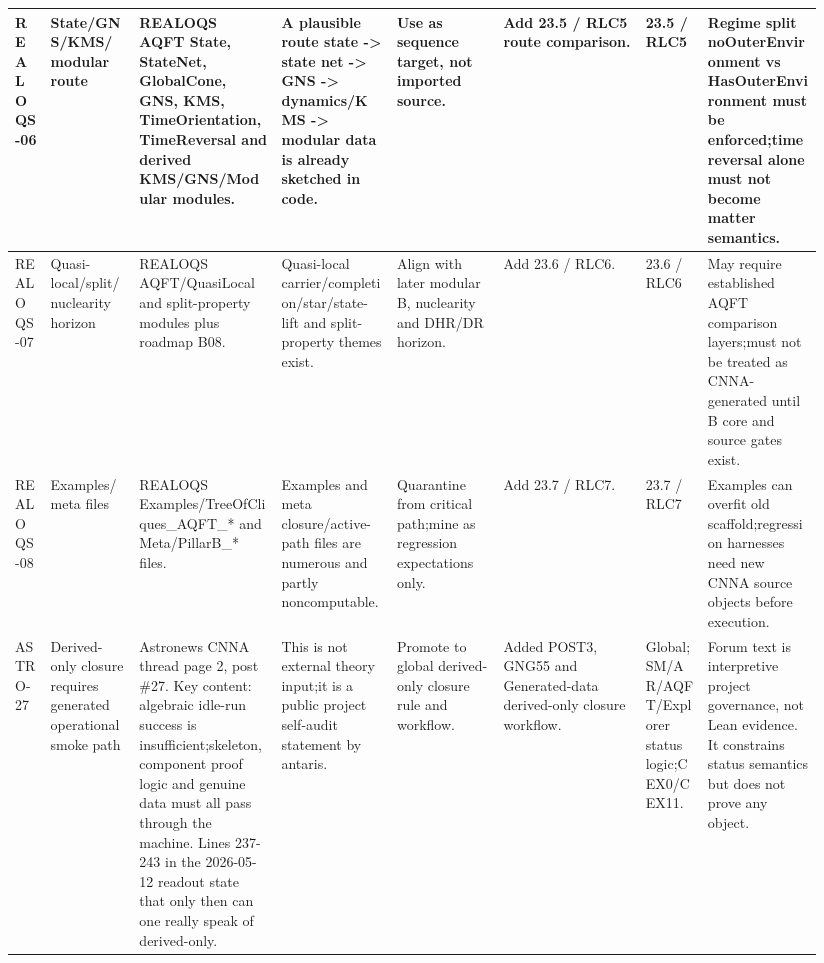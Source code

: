 \begin{longtable}{L{0.04\linewidth} L{0.105\linewidth} L{0.16\linewidth} L{0.13\linewidth} L{0.125\linewidth} L{0.165\linewidth} L{0.075\linewidth} L{0.135\linewidth}}
\hline
\addlinespace[0.24em]
REALOQS-06 & State/\allowbreak{}GNS/\allowbreak{}KMS/\allowbreak{}modular route & REALOQS AQFT State, StateNet, GlobalCone, GNS, KMS, TimeOrientation, TimeReversal and derived KMS/\allowbreak{}GNS/\allowbreak{}Modular modules. & A plausible route state -> state net -> GNS -> dynamics/\allowbreak{}KMS -> modular data is already sketched in code. & Use as sequence target, not imported source. & Add 23.5 /\allowbreak{} RLC5 route comparison. & 23.5 /\allowbreak{} RLC5 & Regime split noOuterEnvironment vs HasOuterEnvironment must be enforced;\newline time reversal alone must not become matter semantics.\\
\hline
\addlinespace[0.24em]
REALOQS-07 & Quasi-local/\allowbreak{}split/\allowbreak{}nuclearity horizon & REALOQS AQFT/\allowbreak{}QuasiLocal and split-property modules plus roadmap B08. & Quasi-local carrier/\allowbreak{}completion/\allowbreak{}star/\allowbreak{}state-lift and split-property themes exist. & Align with later modular B, nuclearity and DHR/\allowbreak{}DR horizon. & Add 23.6 /\allowbreak{} RLC6. & 23.6 /\allowbreak{} RLC6 & May require established AQFT comparison layers;\newline must not be treated as CNNA-generated until B core and source gates exist.\\
\hline
\addlinespace[0.24em]
REALOQS-08 & Examples/\allowbreak{}meta files & REALOQS Examples/\allowbreak{}TreeOfCliques\_AQFT\_* and Meta/\allowbreak{}PillarB\_* files. & Examples and meta closure/\allowbreak{}active-path files are numerous and partly noncomputable. & Quarantine from critical path;\newline mine as regression expectations only. & Add 23.7 /\allowbreak{} RLC7. & 23.7 /\allowbreak{} RLC7 & Examples can overfit old scaffold;\newline regression harnesses need new CNNA source objects before execution.\\
\hline
\addlinespace[0.24em]
ASTRO-27 & Derived-only closure requires generated operational smoke path & Astronews CNNA thread page 2, post \#27. Key content: algebraic idle-run success is insufficient;\newline skeleton, component proof logic and genuine data must all pass through the machine. Lines 237-243 in the 2026-05-12 readout state that only then can one really speak of derived-only. & This is not external theory input;\newline it is a public project self-audit statement by antaris. & Promote to global derived-only closure rule and workflow. & Added POST3, GNG55 and Generated-data derived-only closure workflow. & Global;\newline SM/\allowbreak{}AR/\allowbreak{}AQFT/\allowbreak{}Explorer status logic;\newline CEX0/\allowbreak{}CEX11. & Forum text is interpretive project governance, not Lean evidence. It constrains status semantics but does not prove any object.\\

\end{longtable}
